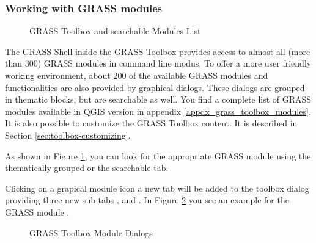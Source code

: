 \subsubsection{Working with GRASS modules}

\begin{figure}[h]
\centering
\caption{GRASS Toolbox and searchable Modules List \nixcaption}\label{fig:grass_modules}
   \goodgap
\end{figure}

The GRASS Shell inside the GRASS Toolbox provides access to almost all (more 
than 300) GRASS modules in command line modus. To offer a more user
friendly working environment, about 200 of the available GRASS modules and 
functionalities are also provided by graphical dialogs. These dialogs are 
grouped in thematic blocks, but are searchable as well. You find a complete 
list of GRASS modules available in QGIS version \CURRENT
in appendix \ref{appdx_grass_toolbox_modules}. It is also possible to 
customize the GRASS Toolbox content. It is described in Section 
\ref{sec:toolbox-customizing}.

As shown in Figure \ref{fig:grass_modules}, you can look for the appropriate 
GRASS module using the thematically grouped  or the 
searchable  tab. 

Clicking on a grapical module icon a new tab will be added to the toolbox 
dialog providing three new sub-tabs ,  and 
. In Figure \ref{fig:grass_module_dialog} you see an example 
for the GRASS module .

\begin{figure}[h]
\centering
\caption{GRASS Toolbox Module Dialogs \nixcaption}\label{fig:grass_module_dialog}
   \goodgap
   \goodgap
\end{figure}

